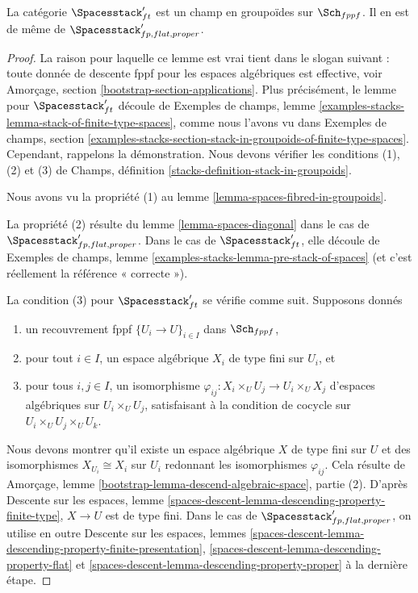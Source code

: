 \begin{lemma}
\label{lemma-spaces-stack}
La catégorie $\Spacesstack'_{ft}$ est un champ en groupoïdes
sur $\Sch_{fppf}$. Il en est de même de
$\Spacesstack'_{fp, flat, proper}$.
\end{lemma}

\begin{proof}
La raison pour laquelle ce lemme est vrai tient dans le slogan suivant : toute
donnée de descente fppf pour les espaces algébriques est effective, voir
Amorçage, section \ref{bootstrap-section-applications}.
Plus précisément, le lemme pour $\Spacesstack'_{ft}$ découle de
Exemples de champs, lemme
\ref{examples-stacks-lemma-stack-of-finite-type-spaces},
comme nous l'avons vu dans Exemples de champs, section
\ref{examples-stacks-section-stack-in-groupoids-of-finite-type-spaces}.
Cependant, rappelons la démonstration. Nous devons vérifier les conditions
(1), (2) et (3) de Champs, définition
\ref{stacks-definition-stack-in-groupoids}.

\medskip\noindent
Nous avons vu la propriété (1) au lemme
\ref{lemma-spaces-fibred-in-groupoids}.

\medskip\noindent
La propriété (2) résulte du lemme \ref{lemma-spaces-diagonal} dans le cas de
$\Spacesstack'_{fp, flat, proper}$.
Dans le cas de $\Spacesstack'_{ft}$, elle découle de
Exemples de champs, lemme
\ref{examples-stacks-lemma-pre-stack-of-spaces}
(et c'est réellement la référence « correcte »).

\medskip\noindent
La condition (3) pour $\Spacesstack'_{ft}$ se vérifie comme suit. Supposons
donnés
\begin{enumerate}
\item un recouvrement fppf $\{U_i \to U\}_{i \in I}$ dans $\Sch_{fppf}$,
\item pour tout $i \in I$, un espace algébrique $X_i$ de type fini sur
$U_i$, et
\item pour tous $i, j \in I$, un isomorphisme
$\varphi_{ij} : X_i \times_U U_j \to U_i \times_U X_j$ d'espaces algébriques
sur $U_i \times_U U_j$, satisfaisant à la condition de cocycle sur
$U_i \times_U U_j \times_U U_k$.
\end{enumerate}
Nous devons montrer qu'il existe un espace algébrique $X$ de type fini sur $U$
et des isomorphismes $X_{U_i} \cong X_i$ sur $U_i$ redonnant les
isomorphismes $\varphi_{ij}$. Cela résulte de
Amorçage, lemme \ref{bootstrap-lemma-descend-algebraic-space}, partie (2).
D'après Descente sur les espaces, lemme
\ref{spaces-descent-lemma-descending-property-finite-type},
$X \to U$ est de type fini.
Dans le cas de $\Spacesstack'_{fp, flat, proper}$, on utilise en outre
Descente sur les espaces, lemmes
\ref{spaces-descent-lemma-descending-property-finite-presentation},
\ref{spaces-descent-lemma-descending-property-flat} et
\ref{spaces-descent-lemma-descending-property-proper}
à la dernière étape.
\end{proof}

